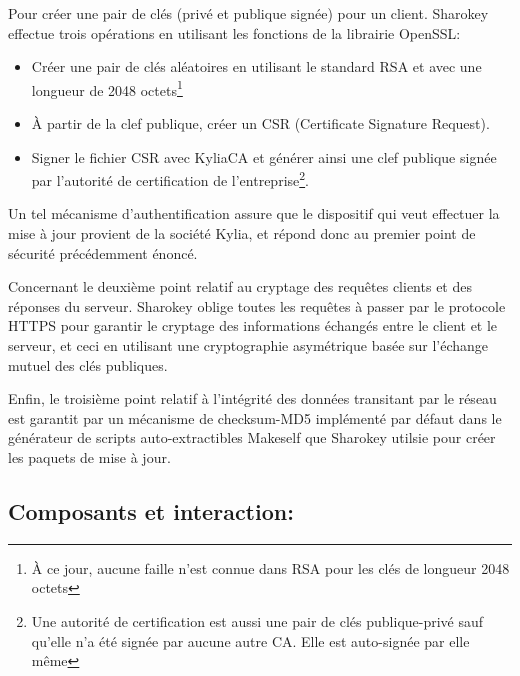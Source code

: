 \documentclass{themeensg}
\begin{document}
Pour créer une pair de clés (privé et publique signée) pour un client. Sharokey effectue trois opérations en utilisant les fonctions de la librairie OpenSSL:
\begin{itemize}
\item Créer une pair de clés aléatoires en utilisant le standard RSA et avec une longueur de 2048 octets\footnote{À ce jour, aucune faille n'est connue dans RSA pour les clés de longueur 2048 octets}
\item À partir de la clef publique, créer un CSR (Certificate Signature Request).
\item Signer le fichier CSR avec KyliaCA et générer ainsi une clef publique signée par l'autorité de certification de l'entreprise\footnote{Une autorité de certification est aussi une pair de clés publique-privé sauf qu'elle n'a été signée par aucune autre CA. Elle est auto-signée par elle même}.
\end{itemize}
Un tel mécanisme d'authentification assure que le dispositif qui veut effectuer la mise à jour provient de la société Kylia, et répond donc au premier point de sécurité précédemment énoncé.

Concernant le deuxième point relatif au cryptage des requêtes clients et des réponses du serveur. Sharokey oblige toutes les requêtes à passer par le protocole HTTPS pour garantir le cryptage des informations échangés entre le client et le serveur, et ceci en utilisant une cryptographie asymétrique basée sur l'échange mutuel des clés publiques.

Enfin, le troisième point relatif à l'intégrité des données transitant par le réseau est garantit par un mécanisme de checksum-MD5 implémenté par défaut dans le générateur de scripts auto-extractibles Makeself que Sharokey utilsie pour créer les paquets de mise à jour.

\subsection{Composants et interaction:}
\end{document}
